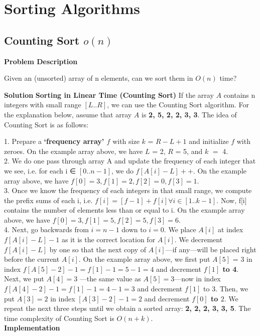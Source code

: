 \chapter{Sorting Algorithms}

\section{Counting Sort $o(n)$}
\textbf{{\Large{Problem Description}}}

Given an (unsorted) array of n elements, can we sort them in $O(n)$ time?\newline
    
\textbf{{\Large{Solution}}}\newline\newline
\textbf{{\large{Sorting in Linear Time (Counting Sort)}}}\newline\newline
If the array $A$ contains n integers with small range \textbf{$[L .. R]$}, we can use the Counting Sort algorithm. For the explanation
below, assume that array $A$ is \textbf{{2, 5, 2, 2, 3, 3}}. The idea of Counting Sort is as follows:

1. Prepare a \textbf{‘frequency array’ $f$} with size $k$ = $R-L+1$ and initialize $f$ with zeroes.
On the example array above, we have $L$ = 2, $R$ = 5, and $k$ $=$ 4.
\newline
\\
2. We do one pass through array A and update the frequency of each integer that we see,
i.e. for each i ∈ $[0..n-1]$, we do \textbf{$f[A[i]-L]++$}.
On the example array above, we have \textbf{$f[0] = 3, f[1] = 2, f[2] = 0, f[3] = 1$}.
\newline
\\
3. Once we know the frequency of each integers in that small range,
we compute the prefix sums of each i, i.e. \textbf{$f[i] = [f-1] + f[i] ∀i ∈ [1..k-1]$}.
Now, f[i] contains the number of elements less than or equal to i.
On the example array above, we have \textbf{$f[0] = 3, f[1] = 5, f[2] = 5, f[3] = 6.$}
\newline
\\

4. Next, go backwards from $i = n - 1$ down to $i = 0$.
We place \textbf{$A[i]$} at index $f[A[i]-L] - 1$ as it is the correct location for \textbf{$A[i]$}. We decrement \textbf{$f[ A[i] - L]$} by one so that the next copy of \textbf{$A[i]$}—if any—will be placed right before the current \textbf{$A[i]$}. On the example array above, we first put $A[5]$ = 3 in index \textbf{$f[A[5] - 2] - 1 = f[1] - 1 = 5 - 1 = 4$} and decrement \textbf{$f[1]$ to 4}. Next, we put \textbf{$A[4] = 3$} —the same value as \textbf{$A[5] = 3$}—now in index \textbf{$f[A[4] - 2] - 1 = f[1] - 1 = 4 - 1 = 3$} and decrement $f[1]$ to $3$. Then, we put \textbf{$A[3] = 2$} in index \textbf{$[A[3] - 2] - 1 = 2$} and decrement \textbf{$f[0]$ to $2$}. We repeat the next three steps until we obtain a sorted array: \textbf{{2, 2, 2, 3, 3, 5}}. The time complexity of Counting Sort is $O(n+k)$.
\newline
\\
\textbf{{\Large{Implementation}}}

